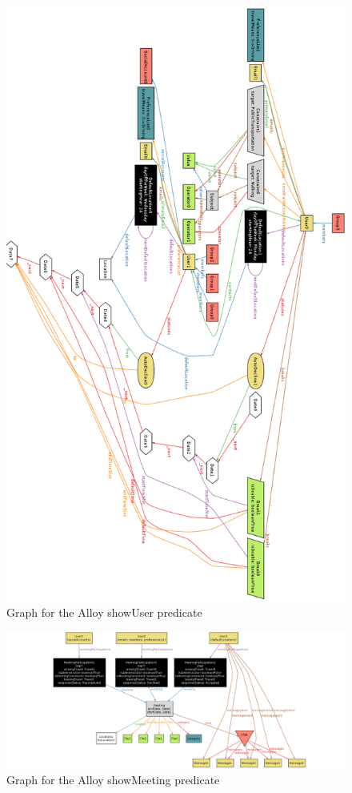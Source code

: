 \begin{figure}
	\vspace*{-0.5cm}
	\centering\includegraphics[height=\textheight]{Images/AlloyShowUser.png}
	\caption{Graph for the Alloy showUser predicate}
\end{figure}

\begin{figure}
	\hspace*{-5cm}
	\centering\includegraphics[scale=0.48]{Images/AlloyShowMeeting2.png}
	\caption{Graph for the Alloy showMeeting predicate}
\end{figure}

